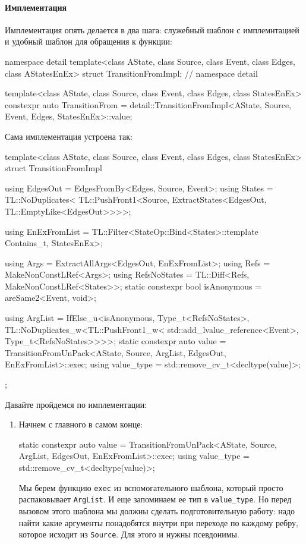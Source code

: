 \documentclass{article}
\begin{document}
{\paragraph{Имплементация}

Имплементация опять делается в два шага: служебный шаблон с имплемнтацией и удобный шаблон для обращения к функции:
\begin{cppcode}
namespace detail {
template<class AState, class Source, class Event, class Edges, class AStatesEnEx>
struct TransitionFromImpl;
} // namespace detail

template<class AState, class Source, class Event, class Edges, class StatesEnEx>
constexpr auto TransitionFrom =
    detail::TransitionFromImpl<AState, Source, Event, Edges, StatesEnEx>::value;
\end{cppcode}
Сама имплементация устроена так:
\begin{cppcode}
template<class AState, class Source, class Event, class Edges, class StatesEnEx>
struct TransitionFromImpl {
  using EdgesOut = EdgesFromBy<Edges, Source, Event>;
  using States = TL::NoDuplicates<
      TL::PushFront1<Source, ExtractStates<EdgesOut, TL::EmptyLike<EdgesOut>>>>;

  using EnExFromList =
      TL::Filter<StateOp::Bind<States>::template Contains_t, StatesEnEx>;

  using Args = ExtractAllArgs<EdgesOut, EnExFromList>;
  using Refs = MakeNonConstLRef<Args>;
  using RefsNoStates = TL::Diff<Refs, MakeNonConstLRef<States>>;
  static constexpr bool isAnonymous = areSame2<Event, void>;

  using ArgList = IfElse_u<isAnonymous, Type_t<RefsNoStates>,
                           TL::NoDuplicates_w<TL::PushFront1_w<
                               std::add_lvalue_reference<Event>, Type_t<RefsNoStates>>>>;
  static constexpr auto value =
      TransitionFromUnPack<AState, Source, ArgList, EdgesOut, EnExFromList>::exec;
  using value_type = std::remove_cv_t<decltype(value)>;
};
\end{cppcode}
Давайте пройдемся по имплементации:
\begin{enumerate}
\item Начнем с главного в самом конце:
\begin{cppcode}[\nonumbers]
static constexpr auto value =
    TransitionFromUnPack<AState, Source, ArgList, EdgesOut, EnExFromList>::exec;
using value_type = std::remove_cv_t<decltype(value)>;
\end{cppcode}
Мы берем функцию \verb"exec" из вспомогательного шаблона, который просто распаковывает \verb"ArgList".
И еще запоминаем ее тип в \verb"value_type".
Но перед вызовом этого шаблона мы должны сделать подготовительную работу: надо найти какие аргументы понадобятся внутри при переходе по каждому ребру, которое исходит из \verb"Source".
Для этого и нужны псевдонимы.


\end{enumerate}}
\end{document}
